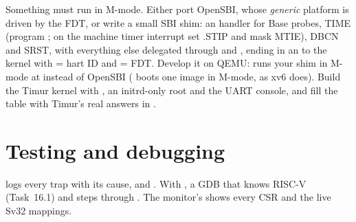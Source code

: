 \documentclass[11pt,a4paper]{article}
\begin{document}
Something must run in M-mode. Either port OpenSBI, whose \emph{generic} platform is driven by the FDT, or write a
small SBI shim: an  handler for Base probes, TIME (program ; on the machine timer interrupt
set .STIP and mask MTIE), DBCN and SRST, with everything else delegated through  and
, ending in an  to the kernel with  = hart ID and  = FDT. Develop it on QEMU:
 runs your shim in M-mode at  instead of
OpenSBI ( boots one image in M-mode, as xv6 does). Build the Timur kernel with ,
an initrd-only root and the UART console, and fill the table with Timur's real answers in .

\section{Testing and debugging}

 logs every trap with its cause,  and .
With , a GDB that knows RISC-V (Task~16.1) and  steps through
. The monitor's  shows every CSR and  the live Sv32 mappings.
\end{document}
